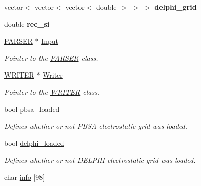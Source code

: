 \begin{DoxyCompactItemize}
\item 
\hypertarget{classGrid_a95c8a328526d61085d95722ee4546032}{
vector$<$ vector$<$ vector$<$ double $>$ $>$ $>$ {\bfseries delphi\_\-grid}}
\label{classGrid_a95c8a328526d61085d95722ee4546032}

\item 
\hypertarget{classGrid_a0d9bc80ce5161c10f16a743027da3109}{
double {\bfseries rec\_\-si}}
\label{classGrid_a0d9bc80ce5161c10f16a743027da3109}

\item 
\hypertarget{classGrid_aa76d01fd180bf81739b26d293307715f}{
\hyperlink{classPARSER}{PARSER} $\ast$ \hyperlink{classGrid_aa76d01fd180bf81739b26d293307715f}{Input}}
\label{classGrid_aa76d01fd180bf81739b26d293307715f}

\begin{DoxyCompactList}\small\item\em Pointer to the \hyperlink{classPARSER}{PARSER} class. \item\end{DoxyCompactList}\item 
\hypertarget{classGrid_a788fa2d58547bc4309743d1ef8981b3d}{
\hyperlink{classWRITER}{WRITER} $\ast$ \hyperlink{classGrid_a788fa2d58547bc4309743d1ef8981b3d}{Writer}}
\label{classGrid_a788fa2d58547bc4309743d1ef8981b3d}

\begin{DoxyCompactList}\small\item\em Pointer to the \hyperlink{classWRITER}{WRITER} class. \item\end{DoxyCompactList}\item 
\hypertarget{classGrid_a7114155ce9e3c8aba21fd7f56566eab2}{
bool \hyperlink{classGrid_a7114155ce9e3c8aba21fd7f56566eab2}{pbsa\_\-loaded}}
\label{classGrid_a7114155ce9e3c8aba21fd7f56566eab2}

\begin{DoxyCompactList}\small\item\em Defines whether or not PBSA electrostatic grid was loaded. \item\end{DoxyCompactList}\item 
\hypertarget{classGrid_a1ec285c2e07c09f86104c4e3cb3a65c7}{
bool \hyperlink{classGrid_a1ec285c2e07c09f86104c4e3cb3a65c7}{delphi\_\-loaded}}
\label{classGrid_a1ec285c2e07c09f86104c4e3cb3a65c7}

\begin{DoxyCompactList}\small\item\em Defines whether or not DELPHI electrostatic grid was loaded. \item\end{DoxyCompactList}\item 
\hypertarget{classGrid_a007cb9dcd963f6e28b9397e812b00e2e}{
char \hyperlink{classGrid_a007cb9dcd963f6e28b9397e812b00e2e}{info} \mbox{[}98\mbox{]}}
\label{classGrid_a007cb9dcd963f6e28b9397e812b00e2e}


\end{DoxyCompactItemize}
